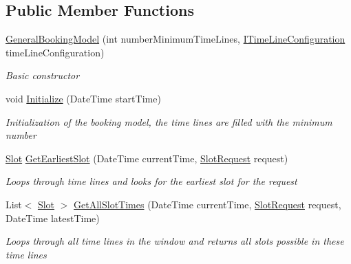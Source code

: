 \subsection*{Public Member Functions}
\begin{DoxyCompactItemize}
\item 
\hyperlink{class_general_health_care_elements_1_1_booking_models_1_1_general_booking_model_ae0a50e02a86b6712f00df31f554beafc}{General\+Booking\+Model} (int number\+Minimum\+Time\+Lines, \hyperlink{interface_general_health_care_elements_1_1_booking_models_1_1_i_time_line_configuration}{I\+Time\+Line\+Configuration} time\+Line\+Configuration)
\begin{DoxyCompactList}\small\item\em Basic constructor \end{DoxyCompactList}\item 
void \hyperlink{class_general_health_care_elements_1_1_booking_models_1_1_general_booking_model_a5d35449b8ed8b22dffdce26c22a6c246}{Initialize} (Date\+Time start\+Time)
\begin{DoxyCompactList}\small\item\em Initialization of the booking model, the time lines are filled with the minimum number \end{DoxyCompactList}\item 
\hyperlink{class_general_health_care_elements_1_1_booking_models_1_1_slot}{Slot} \hyperlink{class_general_health_care_elements_1_1_booking_models_1_1_general_booking_model_af1f9e5d54c8420e3136dad2b07f6ca79}{Get\+Earliest\+Slot} (Date\+Time current\+Time, \hyperlink{class_general_health_care_elements_1_1_booking_models_1_1_slot_request}{Slot\+Request} request)
\begin{DoxyCompactList}\small\item\em Loops through time lines and looks for the earliest slot for the request \end{DoxyCompactList}\item 
List$<$ \hyperlink{class_general_health_care_elements_1_1_booking_models_1_1_slot}{Slot} $>$ \hyperlink{class_general_health_care_elements_1_1_booking_models_1_1_general_booking_model_a1f93d23d6db7201535da735d002d951b}{Get\+All\+Slot\+Times} (Date\+Time current\+Time, \hyperlink{class_general_health_care_elements_1_1_booking_models_1_1_slot_request}{Slot\+Request} request, Date\+Time latest\+Time)
\begin{DoxyCompactList}\small\item\em Loops through all time lines in the window and returns all slots possible in these time lines \end{DoxyCompactList}\item 

\end{DoxyCompactItemize}
